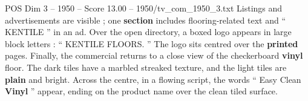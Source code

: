 \begin{textsample}{POS Dim 3 – 1950 – Score 13.00 – 1950/tv\_com\_1950\_3.txt}
Listings and advertisements are visible ; one \textbf{section} includes flooring-related text and “ KENTILE ” in an ad.
Over the open directory, a boxed logo appears in large block letters : “ KENTILE FLOORS. ” The logo sits centred over the \textbf{printed} pages.
Finally, the commercial returns to a close view of the checkerboard \textbf{vinyl} floor.
The dark tiles have a marbled streaked texture, and the light tiles are \textbf{plain} and bright.
Across the centre, in a flowing script, the words “ Easy Clean \textbf{Vinyl} ” appear, ending on the product name over the clean tiled surface.

\end{textsample}
